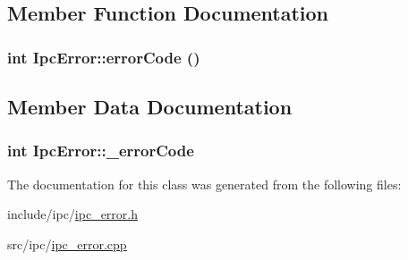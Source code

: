 \subsection{Member Function Documentation}
\hypertarget{classIpcError_f8aa4933424ab14450ba84580ed3d499}{
\subsubsection[{errorCode}]{\setlength{\rightskip}{0pt plus 5cm}int IpcError::errorCode ()}}
\label{classIpcError_f8aa4933424ab14450ba84580ed3d499}




\subsection{Member Data Documentation}
\hypertarget{classIpcError_8aeb5f5a69cc82717ac320000023a3f9}{
\subsubsection[{\_\-errorCode}]{\setlength{\rightskip}{0pt plus 5cm}int {\bf IpcError::\_\-errorCode}}}
\label{classIpcError_8aeb5f5a69cc82717ac320000023a3f9}




The documentation for this class was generated from the following files:\begin{CompactItemize}
\item 
include/ipc/\hyperlink{ipc__error_8h}{ipc\_\-error.h}\item 
src/ipc/\hyperlink{ipc__error_8cpp}{ipc\_\-error.cpp}\end{CompactItemize}
